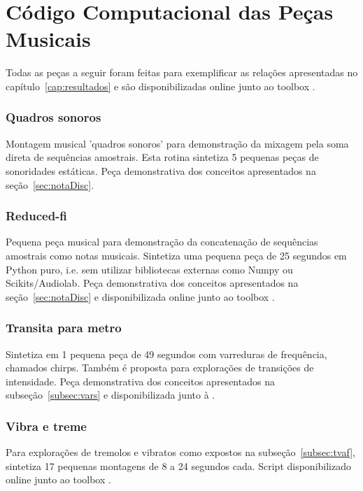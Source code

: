 \chapter{Código Computacional das Peças Musicais}
\label{cap:codigoPecas}
Todas as peças a seguir foram feitas para exemplificar as relações apresentadas no capítulo~\ref{cap:resultados} e são disponibilizadas online junto ao toolbox \massa.\cite{MASSA}


\subsection{Quadros sonoros}\label{ap:quadros}
Montagem musical 'quadros sonoros' para demonstração da mixagem pela soma direta de sequências amostrais. Esta rotina sintetiza 5 pequenas peças de sonoridades estáticas. Peça demonstrativa dos conceitos apresentados na seção~\ref{sec:notaDisc}.

\clearpage

\subsection{Reduced-fi}\label{ap:reduced}
Pequena peça musical para demonstração da concatenação de sequências amostrais como notas musicais. Sintetiza uma pequena peça de 25 segundos em Python puro, i.e. sem utilizar bibliotecas externas como Numpy ou Scikits/Audiolab. Peça demonstrativa dos conceitos apresentados na seção~\ref{sec:notaDisc} e disponibilizada online junto ao toolbox \massa.\cite{MASSA}


\clearpage

\subsection{Transita para metro}\label{ap:transita}
Sintetiza em 1 pequena peça de 49 segundos com varreduras de frequência, chamados chirps. Também é proposta para explorações de transições de intensidade. Peça demonstrativa dos conceitos apresentados na subseção~\ref{subsec:vars} e disponibilizada junto à \massa.\cite{MASSA}

\clearpage
\subsection{Vibra e treme}\label{ap:vibra}
Para explorações de tremolos e vibratos como expostos na subseção~\ref{subsec:tvaf}, sintetiza 17 pequenas montagens de 8 a 24 segundos cada. Script disponibilizado online junto ao toolbox \massa.\cite{MASSA}


